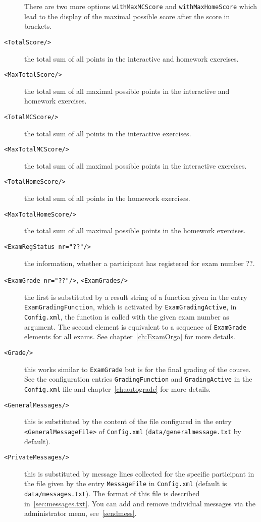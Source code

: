 \documentclass[12pt,openany,a4paper]{book}
\begin{document}
\begin{description}
There are two more options \texttt{withMaxMCScore} and
\texttt{withMaxHomeScore} which lead to the display of the maximal possible
score after the score in brackets.
\item[\texttt{<TotalScore/>}] the total sum of all points in the interactive and
homework exercises.
\item[\texttt{<MaxTotalScore/>}] the total sum of all maximal possible 
points in the interactive and homework exercises.
\item[\texttt{<TotalMCScore/>}] the total sum of all points 
in the interactive exercises.
\item[\texttt{<MaxTotalMCScore/>}] the total sum of all maximal possible points 
in the interactive exercises.
\item[\texttt{<TotalHomeScore/>}] the total sum of all points 
in the homework exercises.
\item[\texttt{<MaxTotalHomeScore/>}] the total sum of all maximal possible 
points in the homework exercises.
\item[\texttt{<ExamRegStatus nr="??"/>}] the information, whether a
participant has registered for exam number ??.
\item[\texttt{<ExamGrade nr="??"/>}, \texttt{<ExamGrades/>}] the first is
substituted by a result string of a function given in the entry 
\texttt{ExamGradingFunction}, which is activated by
\texttt{ExamGradingActive}, in \texttt{Config.xml}, the function is called
with the given exam number as argument. The second element is equivalent to
a sequence of \texttt{ExamGrade} elements for all exams. See
chapter~\ref{ch:ExamOrga} for more details.
\item[\texttt{<Grade/>}] this works similar to 
\texttt{ExamGrade} but is for the
final grading of the course. See the configuration entries
\texttt{GradingFunction} and \texttt{GradingActive} in the
\texttt{Config.xml} file and chapter~\ref{ch:autograde} for more details.
\item[\texttt{<GeneralMessages/>}] this is substituted by the content of the
file configured in the entry \texttt{<GeneralMessageFile>} of 
\texttt{Config.xml} (\texttt{data/generalmessage.txt} by default).
\item[\texttt{<PrivateMessages/>}] this is substituted by message
lines collected for the specific participant in the file given by
the entry \texttt{MessageFile} in \texttt{Config.xml} (default is
\texttt{data/messages.txt}). The format of this file is described
in~\ref{sec:messages.txt}. You can add and remove individual messages
via the administrator menu, see~\ref{sendmess}.
\end{description}
\end{document}
